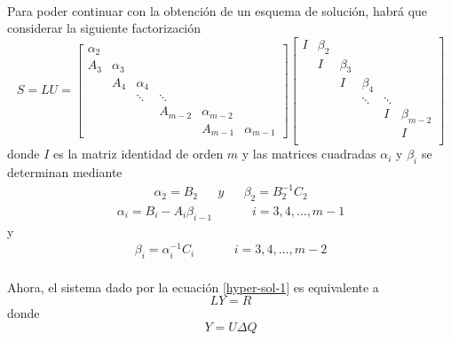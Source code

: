 \documentclass[letterpaper, openright, 12pt]{book}
\begin{document}
	\paragraph*{}
		Para poder continuar con la obtención de un esquema de solución, habrá que considerar la siguiente factorización
		\begin{equation}
			S = LU = \begin{bmatrix}
				\alpha_2\\
				A_3 & \alpha_3 \\
				& A_4 & \alpha_4\\
				& & \ddots & \ddots\\
				& & & A_{m-2} & \alpha_{m-2}\\
				& & & & A_{m-1} & \alpha_{m-1}
			\end{bmatrix}
			\begin{bmatrix}
				I & \beta_2\\
				& I & \beta_3\\
				& & I & \beta_4\\
				& & & \ddots & \ddots\\
				& & & & I & \beta_{m-2}\\
				& & & & & I\\
			\end{bmatrix}
		\end{equation}
		donde $I$ es la matriz identidad de orden $m$ y las matrices cuadradas $\alpha_i$ y $\beta_i$ se determinan mediante
		\begin{align}
			\alpha_2 = B_2 && y && \beta_2 = B_{2}^{-1} C_2
		\end{align}
		\begin{align}
			\alpha_i = B_i - A_i \beta_{i-1} &&&& i = 3, 4, \dots, m-1
		\end{align}
		y
		\begin{align}
			\beta_i = \alpha_{i}^{-1} C_i &&&& i = 3, 4, \dots, m-2
		\end{align}
		
	\paragraph*{}
		Ahora, el sistema dado por la ecuación \ref{hyper-sol-1} es equivalente a
		\begin{equation}
			LY = R
			\label{hyper-sol-2}
		\end{equation}
		donde
		\begin{equation}
			Y = U \Delta Q
			\label{hyper-sol-3}
		\end{equation}
	
\end{document}
